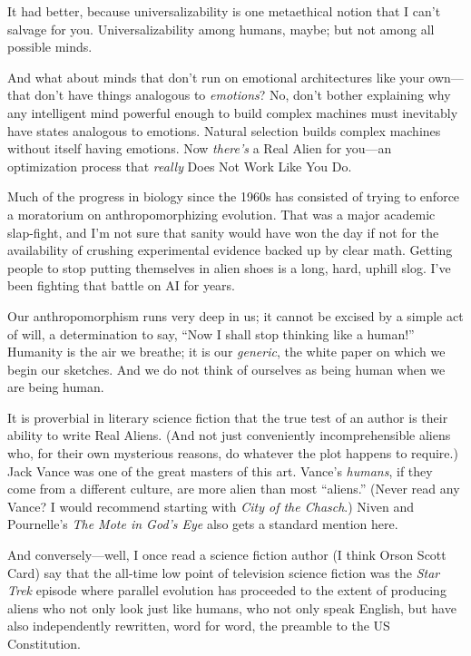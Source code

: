 {
 It had better, because universalizability is one metaethical
notion that I can't salvage for you. Universalizability
among humans, maybe; but not among all possible minds.}

{
 And what about minds that don't run on emotional
architectures like your own---that don't have things
analogous to \textit{emotions}? No, don't bother
explaining why any intelligent mind powerful enough to build complex
machines must inevitably have states analogous to emotions. Natural
selection builds complex machines without itself having emotions. Now
\textit{there's} a Real Alien for you---an optimization
process that \textit{really} Does Not Work Like You Do.}

{
 Much of the progress in biology since the 1960s has consisted of
trying to enforce a moratorium on anthropomorphizing evolution. That
was a major academic slap-fight, and I'm not sure that
sanity would have won the day if not for the availability of crushing
experimental evidence backed up by clear math. Getting people to stop
putting themselves in alien shoes is a long, hard, uphill slog.
I've been fighting that battle on AI for years.}

{
 Our anthropomorphism runs very deep in us; it cannot be excised by
a simple act of will, a determination to say, ``Now I
shall stop thinking like a human!'' Humanity is the
air we breathe; it is our \textit{generic}, the white paper on which we
begin our sketches. And we do not think of ourselves as being human
when we are being human.}

{
 It is proverbial in literary science fiction that the true test of
an author is their ability to write Real Aliens. (And not just
conveniently incomprehensible aliens who, for their own mysterious
reasons, do whatever the plot happens to require.) Jack Vance was one
of the great masters of this art. Vance's
\textit{humans}, if they come from a different culture, are more alien
than most ``aliens.'' (Never read
any Vance? I would recommend starting with \textit{City of the
Chasch}.) Niven and Pournelle's \textit{The Mote in
God's Eye} also gets a standard mention here.}

{
 And conversely---well, I once read a science fiction author (I
think Orson Scott Card) say that the all-time low point of television
science fiction was the \textit{Star Trek} episode where parallel
evolution has proceeded to the extent of producing aliens who not only
look just like humans, who not only speak English, but have also
independently rewritten, word for word, the preamble to the US
Constitution.}


